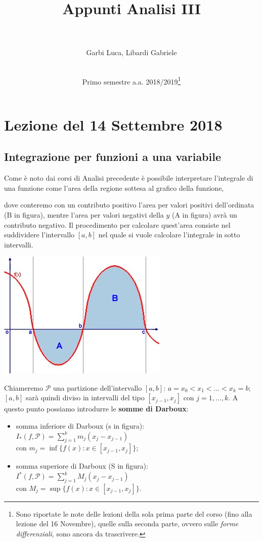 \documentclass[10pt]{article}
\title{Appunti Analisi III}
\author{\\
		\\  
        Garbi Luca, Libardi Gabriele\\
        \\   
}
\date{{\LARGE Primo semestre a.a. 2018/2019\footnote{Sono riportate le note delle lezioni della sola prima parte del corso (fino alla lezione del 16 Novembre), quelle sulla seconda parte, ovvero sulle \textit{forme differenziali}, sono ancora da trascrivere.}}}
\theoremstyle{plain}
\theoremstyle{definition}
\begin{document}
\maketitle 

\thispagestyle{empty} %
\newpage 
\tableofcontents
\newpage

\section{Lezione del 14 Settembre 2018}
\subsection{Integrazione per funzioni a una variabile}
Come è noto dai corsi di Analisi precedente è possibile interpretare l'integrale di una funzione come l'area della regione sottesa al grafico della funzione,

\begin{minipage}{.6\textwidth}
 dove conteremo con un contributo positivo l'area per valori positivi dell'ordinata (B in figura), mentre l'area per valori negativi della $y$ (A in figura) avrà un contributo negativo. Il procedimento per calcolare quest'area consiste nel suddividere l'intervallo $[a, b]$ nel quale si vuole calcolare l'integrale in sotto intervalli.
\end{minipage}%
\begin{minipage}{.50\textwidth}
\centering
\includegraphics[width=.9\textwidth]{fig1.jpg}
\end{minipage}
Chiameremo $\mathcal{P}$ una partizione dell'intervallo $[a, b]$: $a=x_0<x_1<...<x_k=b$; $[a, b]$ sarà quindi diviso in intervalli del tipo $[x_{j-1},x_j]$ con $j=1,...,k$. 
A questo punto possiamo introdurre le \textbf{somme di Darboux}:
\begin{itemize}
    \item somma inferiore di Darboux (s in figura): $I_*(f,\mathcal{P})=\sum_{j=1}^km_j(x_j-x_{j-1})$ 
    \\ con $m_j=\inf\{ f(x): x\in [x_{j-1},x_j]\}$;
    \item somma superiore di Darboux (S in figura): $I^*(f,\mathcal{P})=\sum_{j=1}^kM_j(x_j-x_{j-1})$ 
    \\ con $M_j=\sup\{ f(x): x\in [x_{j-1},x_j]\}$.
\end{itemize}
\end{document}
